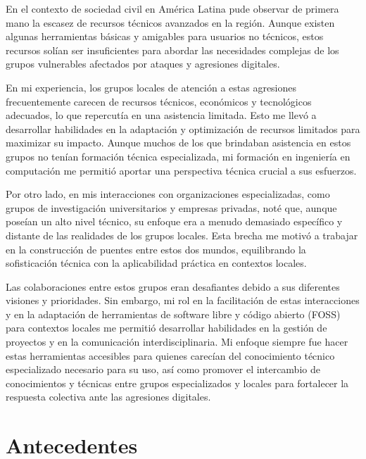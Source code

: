 \documentclass[12pt]{caltech_thesis}
\begin{document}
En el contexto de sociedad civil en América Latina pude observar de primera mano la escasez de recursos técnicos avanzados en la región. Aunque existen algunas herramientas básicas y amigables para usuarios no técnicos, estos recursos solían ser insuficientes para abordar las necesidades complejas de los grupos vulnerables afectados por ataques y agresiones digitales.

En mi experiencia, los grupos locales de atención a estas agresiones frecuentemente carecen de recursos técnicos, económicos y tecnológicos adecuados, lo que repercutía en una asistencia limitada. Esto me llevó a desarrollar habilidades en la adaptación y optimización de recursos limitados para maximizar su impacto. Aunque muchos de los que brindaban asistencia en estos grupos no tenían formación técnica especializada, mi formación en ingeniería en computación me permitió aportar una perspectiva técnica crucial a sus esfuerzos.

Por otro lado, en mis interacciones con organizaciones especializadas, como grupos de investigación universitarios y empresas privadas, noté que, aunque poseían un alto nivel técnico, su enfoque era a menudo demasiado específico y distante de las realidades de los grupos locales. Esta brecha me motivó a trabajar en la construcción de puentes entre estos dos mundos, equilibrando la sofisticación técnica con la aplicabilidad práctica en contextos locales.

Las colaboraciones entre estos grupos eran desafiantes debido a sus diferentes visiones y prioridades. Sin embargo, mi rol en la facilitación de estas interacciones y en la adaptación de herramientas de software libre y código abierto (FOSS) para contextos locales me permitió desarrollar habilidades en la gestión de proyectos y en la comunicación interdisciplinaria. Mi enfoque siempre fue hacer estas herramientas accesibles para quienes carecían del conocimiento técnico especializado necesario para su uso, así como promover el intercambio de conocimientos y técnicas entre grupos especializados y locales para fortalecer la respuesta colectiva ante las agresiones digitales.


\chapter{Antecedentes}
\end{document}
